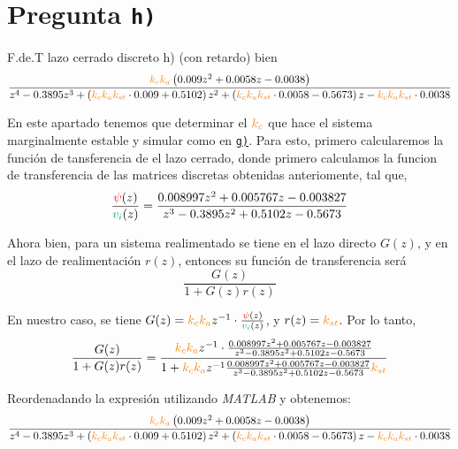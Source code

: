 \section{Pregunta \texttt{h)}}\label{pregunta-h}


F.de.T lazo cerrado discreto h) (con retardo)
bien
\begin{equation}
    \frac{ \nara{k_c k_a} \left( 0.009 z^2 + 0.0058 z - 0.0038 \right)}
    { z^4 -0.3895z^3 + \left( \nara{k_c k_a k_{st}} \cdot 0.009 + 0.5102
    \right) z^2 
    + \left( \nara{k_c k_a k_{st}} \cdot0.0058 -0.5673 \right) z 
    - \nara{k_c k_a k_{st}} \cdot 0.0038 }
\end{equation}


En este apartado tenemos que determinar el $\nara{k_c}$  que hace el sistema
marginalmente estable y simular como en \hyperref[pregunta-g]{\texttt{g)}}. Para
esto, primero calcularemos la función de tansferencia de el lazo cerrado, donde
primero calculamos la funcion de transferencia de las matrices discretas obtenidas
anteriomente, tal que,
\begin{equation}
   \frac{\rojo{\psi}(z)}{\verd{v_{i}}(z)} = \frac{0.008997z^2 + 0.005767 z - 0.003827}
    {z^3 - 0.3895 z^2 + 0.5102 z -0.5673}
\end{equation}

Ahora bien, para un sistema realimentado se tiene en el lazo directo $G(z)$, y 
en el lazo de realimentación $r(z)$, entonces su función de transferencia será
\begin{equation}
    \frac{G(z)}{1 + G(z)r(z)}
\end{equation}

En nuestro caso, se tiene $G(z) = \nara{k_{c} k_{a}} z^{-1} \cdot \frac{\rojo{\psi}(z)}{\verd{v_i}(z)}$,
y $r(z) = \nara{k_{st}}$. Por lo tanto,
\begin{equation}
    \frac{G(z)}{1 + G(z)r(z)} = \dfrac{\nara{k_ck_a} z^{-1} \cdot\frac{0.008997z^2 + 0.005767 z - 0.003827}
    {z^3 - 0.3895 z^2 + 0.5102 z -0.5673}}
    {1+\nara{k_ck_a} z^{-1} \frac{0.008997z^2 + 0.005767 z - 0.003827}
    {z^3 - 0.3895 z^2 + 0.5102 z -0.5673}\nara{k_{st}}}
\end{equation}

Reordenadando la expresión utilizando \textit{MATLAB} y obtenemos:
\begin{equation}\label{eq:fdt-LCd}
        \frac{ \nara{k_c k_a} \left( 0.009 z^2 + 0.0058 z - 0.0038 \right)}
        { z^4 -0.3895z^3 + \left( \nara{k_c k_a k_{st}} \cdot 0.009 + 0.5102
        \right) z^2 
        + \left( \nara{k_c k_a k_{st}} \cdot0.0058 -0.5673 \right) z 
        - \nara{k_c k_a k_{st}} \cdot 0.0038 }
\end{equation}

